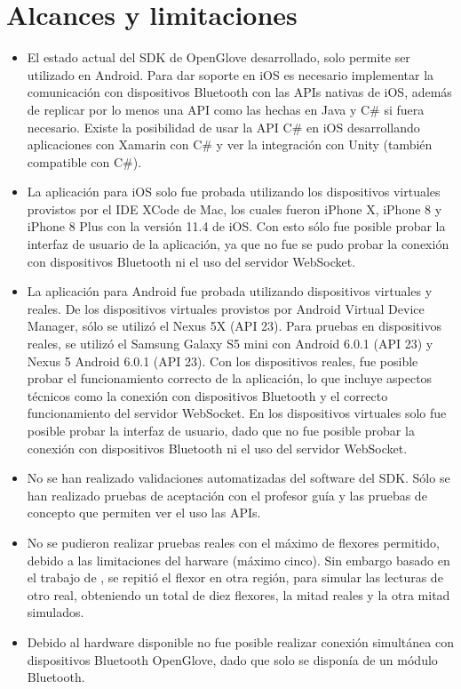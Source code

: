 \section{Alcances y limitaciones}

\begin{itemize}
	
	\item El estado actual del SDK de OpenGlove desarrollado, solo permite ser utilizado en Android. Para dar soporte en iOS es necesario implementar la comunicación con dispositivos Bluetooth con las APIs nativas de iOS, además de replicar por lo menos una API como las hechas en Java y C\# si fuera necesario. Existe la posibilidad de usar la API C\# en iOS desarrollando aplicaciones con Xamarin con C\# y ver la integración con Unity (también compatible con C\#).
	
	\item La aplicación para iOS solo fue probada utilizando los dispositivos virtuales provistos por el IDE XCode de Mac, los cuales fueron iPhone X, iPhone 8 y iPhone 8 Plus  con la versión 11.4 de iOS. Con esto sólo fue posible probar la interfaz de usuario de la aplicación, ya que no fue se pudo probar la conexión con dispositivos Bluetooth ni el uso del servidor WebSocket.
	
	\item La aplicación para Android fue probada utilizando dispositivos virtuales y reales. De los dispositivos virtuales provistos por Android Virtual Device Manager, sólo se utilizó el Nexus 5X (API 23). Para pruebas en dispositivos reales, se utilizó el Samsung Galaxy S5 mini con Android 6.0.1 (API 23) y Nexus 5 Android 6.0.1 (API 23). Con los dispositivos reales, fue posible probar el funcionamiento correcto de la aplicación, lo que incluye aspectos técnicos como la conexión con dispositivos Bluetooth y el correcto funcionamiento del servidor WebSocket. En los dispositivos virtuales solo fue posible probar la interfaz de usuario, dado que no fue posible probar la conexión con dispositivos Bluetooth ni el uso del servidor WebSocket.
	
	\item No se han realizado validaciones automatizadas del software del SDK. Sólo se han realizado pruebas de aceptación con el profesor guía y las pruebas de concepto que permiten ver el uso las APIs.
	
	\item No se pudieron realizar pruebas reales con el máximo de flexores permitido, debido a las limitaciones del harware (máximo cinco). Sin embargo basado en el trabajo de \cite{tesis-cerda-rodrigo}, se repitió el flexor en otra región, para simular las lecturas de otro real, obteniendo un total de diez flexores, la mitad reales y la otra mitad simulados.
	
	\item Debido al hardware disponible no fue posible realizar conexión simultánea con dispositivos Bluetooth OpenGlove, dado que solo se disponía de un módulo Bluetooth.
	
	
\end{itemize}